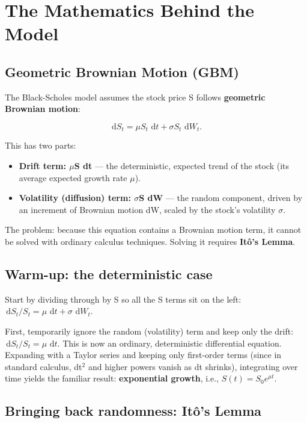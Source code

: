 \documentclass[12pt,openany]{book}
\theoremstyle{definition}
\theoremstyle{remark}
\newcommand{\dd}{\,\mathrm{d}}
\begin{document}
\section{The Mathematics Behind the Model}

\subsection{Geometric Brownian Motion (GBM)}

The Black-Scholes model assumes the stock price S follows \textbf{geometric Brownian motion}:

\[\dd S_t=\mu S_t\,\dd t+\sigma S_t\,\dd W_t.\]

This has two parts:

\begin{itemize}
\item \textbf{Drift term: \(\mu\)S dt} --- the deterministic, expected trend of the stock (its average expected growth rate \(\mu\)).


\item \textbf{Volatility (diffusion) term: \(\sigma\)S dW} --- the random component, driven by an increment of Brownian motion dW, scaled by the stock's volatility \(\sigma\).


\end{itemize}

The problem: because this equation contains a Brownian motion term, it cannot be solved with ordinary calculus techniques. Solving it requires \textbf{Itô's Lemma}.

\subsection{Warm-up: the deterministic case}

Start by dividing through by S so all the S terms sit on the left: \(\dd S_t/S_t=\mu\,\dd t+\sigma\,\dd W_t\).

First, temporarily ignore the random (volatility) term and keep only the drift: \(\dd S_t/S_t=\mu\,\dd t\). This is now an ordinary, deterministic differential equation. Expanding with a Taylor series and keeping only first-order terms (since in standard calculus, dt\(^2\) and higher powers vanish as dt shrinks), integrating over time yields the familiar result: \textbf{exponential growth}, i.e., \(S(t)=S_0e^{\mu t}\).

\subsection{Bringing back randomness: Itô's Lemma}
\end{document}

